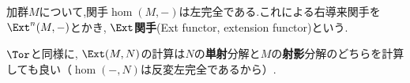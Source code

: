 \begin{defi}[$\Ext$]
	加群$M$について,関手$\hom(M,-)$は左完全である.これによる右導来関手を$\Ext^n(M,-)$とかき, $\Ext$\textbf{関手}(Ext functor, extension functor)という.
\end{defi}

$\Tor$と同様に, $\Ext(M,N)$の計算は$N$の\textbf{単射}分解と$M$の\textbf{射影}分解のどちらを計算しても良い（$\hom(-,N)$は反変左完全であるから）.










%
